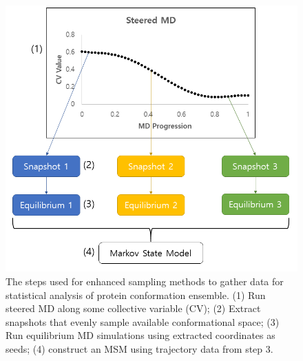 \begin{figure}[htp]
\includegraphics[width=\linewidth]{LIVECOMS/03_steered_md/ensemble-md-protocol.png}
\caption{The steps used for enhanced sampling methods to gather data for statistical analysis of protein conformation ensemble. (1) Run steered MD along some collective variable (CV); (2) Extract snapshots that evenly sample available conformational space; (3) Run equilibrium MD simulations using extracted coordinates as seeds; (4) construct an MSM using trajectory data from step 3.}
\label{fig:ensemble-protocol}
\end{figure}